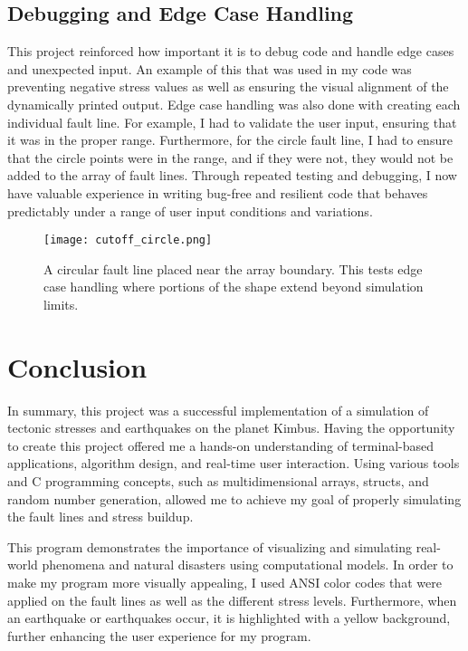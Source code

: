 \documentclass[conference]{IEEEtran}
\begin{document}
\subsection{Debugging and Edge Case Handling}
This project reinforced how important it is to debug code and handle edge cases and unexpected input. An example of this that was used in my code was preventing negative stress values as well as ensuring the visual alignment of the dynamically printed output. Edge case handling was also done with creating each individual fault line. For example, I had to validate the user input, ensuring that it was in the proper range. Furthermore, for the circle fault line, I had to ensure that the circle points were in the range, and if they were not, they would not be added to the array of fault lines. Through repeated testing and debugging, I now have valuable experience in writing bug-free and resilient code that behaves predictably under a range of user input conditions and variations. 

\begin{figure}[!htbp]
    \centering
    \texttt{[image: cutoff\_circle.png]}
    \caption{A circular fault line placed near the array boundary. This tests edge case handling where portions of the shape extend beyond simulation limits.}
    \label{fig:cutoffcircle}
\end{figure}

\newpage

\section{Conclusion}
In summary, this project was a successful implementation of a simulation of tectonic stresses and earthquakes on the planet Kimbus. Having the opportunity to create this project offered me a hands-on understanding of terminal-based applications, algorithm design, and real-time user interaction. Using various tools and C programming concepts, such as multidimensional arrays, structs, and random number generation, allowed me to achieve my goal of properly simulating the fault lines and stress buildup. 

This program demonstrates the importance of visualizing and simulating real-world phenomena and natural disasters using computational models. In order to make my program more visually appealing, I used ANSI color codes that were applied on the fault lines as well as the different stress levels. Furthermore, when an earthquake or earthquakes occur, it is highlighted with a yellow background, further enhancing  the user experience for my program.
\end{document}
